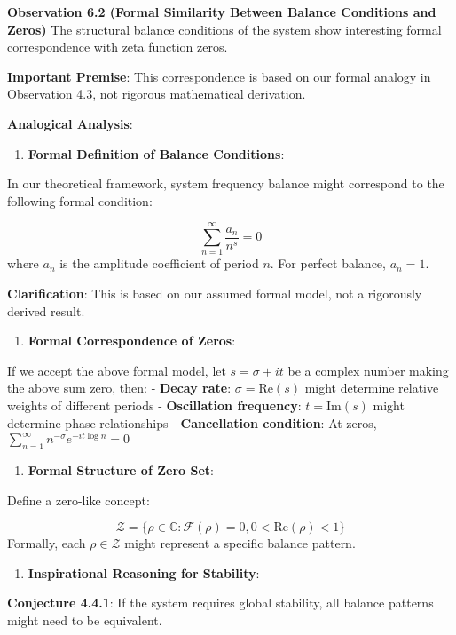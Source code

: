 \textbf{Observation 6.2 (Formal Similarity Between Balance Conditions and Zeros)}
\label{thm:4.4}
The structural balance conditions of the system show interesting formal correspondence with zeta function zeros.

\textbf{Important Premise}: This correspondence is based on our formal analogy in Observation 4.3, not rigorous mathematical derivation.

\textbf{Analogical Analysis}:

\begin{enumerate}
\item \textbf{Formal Definition of Balance Conditions}:
\end{enumerate}
   In our theoretical framework, system frequency balance might correspond to the following formal condition:
   
\begin{equation}
\sum_{n=1}^{\infty} \frac{a_n}{n^s} = 0
\end{equation}
   where $a_n$ is the amplitude coefficient of period $n$. For perfect balance, $a_n = 1$.
   
   \textbf{Clarification}: This is based on our assumed formal model, not a rigorously derived result.
   
\begin{enumerate}
\item \textbf{Formal Correspondence of Zeros}:
\end{enumerate}
   If we accept the above formal model, let $s = \sigma + it$ be a complex number making the above sum zero, then:
   - \textbf{Decay rate}: $\sigma = \text{Re}(s)$ might determine relative weights of different periods
   - \textbf{Oscillation frequency}: $t = \text{Im}(s)$ might determine phase relationships
   - \textbf{Cancellation condition}: At zeros, $\sum_{n=1}^{\infty} n^{-\sigma}e^{-it\log n} = 0$
   
\begin{enumerate}
\item \textbf{Formal Structure of Zero Set}:
\end{enumerate}
   Define a zero-like concept:
   
\begin{equation}
\mathcal{Z} = \{\rho \in \mathbb{C}: \mathcal{F}(\rho) = 0, 0 < \text{Re}(\rho) < 1\}
\end{equation}
   Formally, each $\rho \in \mathcal{Z}$ might represent a specific balance pattern.
   
\begin{enumerate}
\item \textbf{Inspirational Reasoning for Stability}:
\end{enumerate}
   \textbf{Conjecture 4.4.1}: If the system requires global stability, all balance patterns might need to be equivalent.
   
